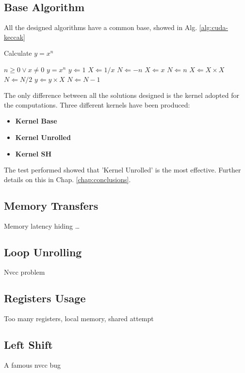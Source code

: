 \subsection{Base Algorithm}
All the designed algorithms have a common base, showed in Alg. \ref{alg:cuda-keccak}
\begin{algorithm}                      %
\caption{Calculate $y = x^n$}          %
\label{alg:cuda-keccak}                %
\begin{algorithmic}                    %
\REQUIRE $n \geq 0 \vee x \neq 0$
\ENSURE $y = x^n$
\STATE $y \Leftarrow 1$
\STATE $X \Leftarrow 1 / x$
\STATE $N \Leftarrow -n$
\ELSE
\STATE $X \Leftarrow x$
\STATE $N \Leftarrow n$
\ENDIF
{}
\STATE $X \Leftarrow X \times X$
\STATE $N \Leftarrow N / 2$
\ELSE[$N$ is odd]
\STATE $y \Leftarrow y \times X$
\STATE $N \Leftarrow N - 1$
\ENDIF
\ENDWHILE
\end{algorithmic}
\end{algorithm}
The only difference between all the solutions designed is the kernel adopted for the computations. Three different kernels have been produced:\\
\begin{itemize}
\item \textbf{Kernel Base}
\item \textbf{Kernel Unrolled}
\item \textbf{Kernel SH}
\end{itemize}
The test performed showed that 'Kernel Unrolled' is the most effective. Further details on this in Chap. \ref{chap:conclusions}.

\subsection{Memory Transfers}
Memory latency hiding \dots 

\subsection{Loop Unrolling}
Nvcc problem

\subsection{Registers Usage}
Too many registers, local memory, shared attempt

\subsection{Left Shift}
A famous nvcc bug
